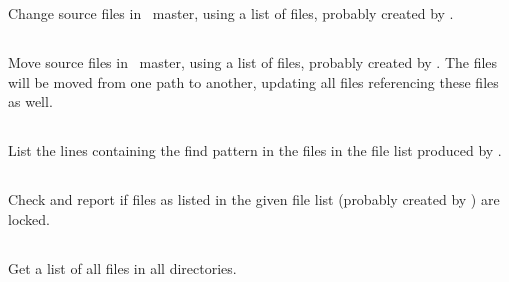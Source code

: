 Change source files in \aipspp\ master, using a list of files, probably
created by .


\newpage

\subsection{}
\label{UPmove}

Move source files in \aipspp\ master, using a list of files, probably
created by . The files will be moved from one path to another,
updating all files referencing these files as well.


\newpage

\subsection{}
\label{UPlist}

List the lines containing the find pattern in the files in the file list
produced by .


\newpage

\subsection{}
\label{UPlock}

Check and report if files as listed in the given file list (probably created
by ) are locked.


\newpage

\subsection{}
\label{UPtmpl}

Get a list of all files in all  directories.

